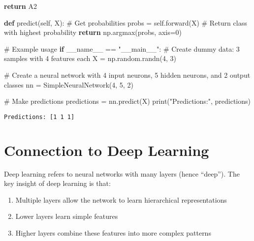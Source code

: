 \documentclass[
  letterpaper,
  DIV=11,
  numbers=noendperiod]{scrreprt}
\newenvironment{Shaded}{\begin{snugshade}}{\end{snugshade}}
\newcommand{\BuiltInTok}[1]{\textcolor[rgb]{0.00,0.23,0.31}{#1}}
\newcommand{\CommentTok}[1]{\textcolor[rgb]{0.37,0.37,0.37}{#1}}
\newcommand{\ControlFlowTok}[1]{\textcolor[rgb]{0.00,0.23,0.31}{\textbf{#1}}}
\newcommand{\DecValTok}[1]{\textcolor[rgb]{0.68,0.00,0.00}{#1}}
\newcommand{\KeywordTok}[1]{\textcolor[rgb]{0.00,0.23,0.31}{\textbf{#1}}}
\newcommand{\NormalTok}[1]{\textcolor[rgb]{0.00,0.23,0.31}{#1}}
\newcommand{\OperatorTok}[1]{\textcolor[rgb]{0.37,0.37,0.37}{#1}}
\newcommand{\StringTok}[1]{\textcolor[rgb]{0.13,0.47,0.30}{#1}}
\newcommand{\VariableTok}[1]{\textcolor[rgb]{0.07,0.07,0.07}{#1}}
\providecommand{\tightlist}{%
  \setlength{\itemsep}{0pt}\setlength{\parskip}{0pt}}\usepackage{longtable,booktabs,array}
\begin{document}
\begin{Shaded}
\begin{Highlighting}[]
        \ControlFlowTok{return}\NormalTok{ A2}
    
    \KeywordTok{def}\NormalTok{ predict(}\VariableTok{self}\NormalTok{, X):}
        \CommentTok{\# Get probabilities}
\NormalTok{        probs }\OperatorTok{=} \VariableTok{self}\NormalTok{.forward(X)}
        \CommentTok{\# Return class with highest probability}
        \ControlFlowTok{return}\NormalTok{ np.argmax(probs, axis}\OperatorTok{=}\DecValTok{0}\NormalTok{)}

\CommentTok{\# Example usage}
\ControlFlowTok{if} \VariableTok{\_\_name\_\_} \OperatorTok{==} \StringTok{"\_\_main\_\_"}\NormalTok{:}
    \CommentTok{\# Create dummy data: 3 samples with 4 features each}
\NormalTok{    X }\OperatorTok{=}\NormalTok{ np.random.randn(}\DecValTok{4}\NormalTok{, }\DecValTok{3}\NormalTok{)}
    
    \CommentTok{\# Create a neural network with 4 input neurons, 5 hidden neurons, and 2 output classes}
\NormalTok{    nn }\OperatorTok{=}\NormalTok{ SimpleNeuralNetwork(}\DecValTok{4}\NormalTok{, }\DecValTok{5}\NormalTok{, }\DecValTok{2}\NormalTok{)}
    
    \CommentTok{\# Make predictions}
\NormalTok{    predictions }\OperatorTok{=}\NormalTok{ nn.predict(X)}
    \BuiltInTok{print}\NormalTok{(}\StringTok{"Predictions:"}\NormalTok{, predictions)}
\end{Highlighting}
\end{Shaded}

\begin{verbatim}
Predictions: [1 1 1]
\end{verbatim}

\section{Connection to Deep Learning}\label{connection-to-deep-learning}

Deep learning refers to neural networks with many layers (hence
``deep''). The key insight of deep learning is that:

\begin{enumerate}
\def\labelenumi{\arabic{enumi}.}
\tightlist
\item
  Multiple layers allow the network to learn hierarchical
  representations
\item
  Lower layers learn simple features
\item
  Higher layers combine these features into more complex patterns
\end{enumerate}
\end{document}
